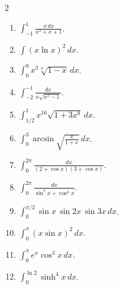 \begin{enumerate}
\begin{multicols}{2}
\begin{enumerate}
  \item $\displaystyle \int_{-1}^{1} \frac{x\,dx}{x^{2}+x+1}$.

  \item $\displaystyle \int (x\ln x)^{2}\,dx$.

  \item $\displaystyle \int_{0}^{9} x^{3}\sqrt[3]{1-x}\,dx$.

  \item $\displaystyle \int_{-2}^{-1} \frac{dx}{x\sqrt{x^{2}-1}}$.

  \item $\displaystyle \int_{1/2}^{1} x^{16}\sqrt{1+3x^{8}}\,dx$.

  \item $\displaystyle \int_{0}^{3} \arcsin\sqrt{\frac{x}{1+x}}\,dx$.

  \item $\displaystyle \int_{0}^{2\pi} \frac{dx}{(2+\cos x)(3+\cos x)}$.

  \item $\displaystyle \int_{0}^{2\pi} \frac{dx}{\sin^{4}x+\cos^{4}x}$.

  \item $\displaystyle \int_{0}^{\pi/2} \sin x\,\sin 2x\,\sin 3x\,dx$.

  \item $\displaystyle \int_{0}^{\pi} (x\sin x)^{2}\,dx$.

  \item $\displaystyle \int_{0}^{\pi} e^{x}\cos^{3}x\,dx$.

  \item $\displaystyle \int_{0}^{\ln 2} \sinh^{4}x\,dx$.
\end{enumerate}
    
\end{multicols}
\end{enumerate}
\newpage
